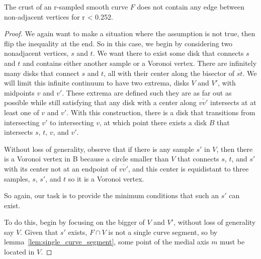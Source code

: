 \begin{theorem}
	The crust of an r-sampled smooth curve $F$ does not contain any edge between non-adjacent vertices for r < 0.252.
\end{theorem}
\begin{proof}
	We again want to make a situation where the assumption is not true, then flip the inequality at the end.
	So in this case, we begin by considering two nonadjacent vertices, $s$ and $t$.
	We want there to exist some disk that connects $s$ and $t$ and contains either another sample or a Voronoi vertex.
	There are infinitely many disks that connect $s$ and $t$, all with their center along the bisector of $\overline{st}$.
	We will limit this infinite continuum to have two extrema, disks $V$ and $V'$, with midpoints $v$ and $v'$.
	These extrema are defined such they are as far out as possible while still satisfying that any disk with a center along $\overline{vv'}$ intersects at at least one of $v$ and $v'$.
	With this construction, there is a disk that transitions from intersecting $v'$ to intersecting $v$, at which point there exists a disk $B$ that intersects $s$, $t$, $v$, and $v'$.

	Without loss of generality, observe that if there is any sample $s'$ in $V$, then there is a Voronoi vertex in B because a circle smaller than $V$ that connects $s$, $t$, and $s'$ with its center not at an endpoint of $\overline{vv'}$, and this center is equidistant to three samples, $s$, $s'$, and $t$ so it is a Voronoi vertex.

	So again, our task is to provide the minimum conditions that such an $s'$ can exist.

	To do this, begin by focusing on the bigger of $V$ and $V'$, without loss of generality say $V$.
	Given that $s'$ exists, $F\cap V$ is not a single curve segment, so by lemma~\ref{lem:single_curve_segment}, some point of the medial axis $m$ must be located in $V$.


\end{proof}
